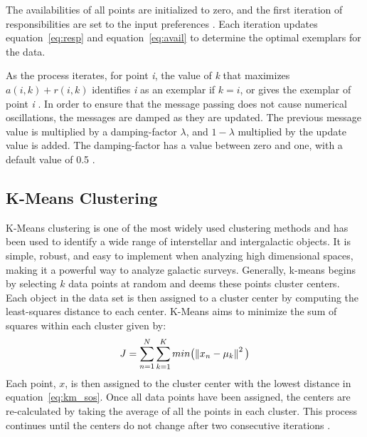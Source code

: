 The availabilities of all points are initialized to zero, and the first iteration of responsibilities are set to the input preferences \citet{frey07}. 
Each iteration updates equation~\ref{eq:resp} and equation~\ref{eq:avail} to determine the optimal exemplars for the data.

As the process iterates, for point \textit{i}, the value of \textit{k} that maximizes $a(i,k) + r(i,k)$ identifies \textit{i} as an exemplar if $k=i$, or gives the exemplar of point \textit{i} \citet{frey07}.
In order to ensure that the message passing does not cause numerical oscillations, the messages are damped as they are updated.
The previous message value is multiplied by a damping-factor $\lambda$, and $1 - \lambda$ multiplied by the update value is added.
The damping-factor has a value between zero and one, with a default value of 0.5 \citet{frey07}.

\subsection{K-Means Clustering}
K-Means clustering is one of the most widely used clustering methods and has been used to identify a wide range of interstellar and intergalactic objects. %
It is simple, robust, and easy to implement when analyzing high dimensional spaces, making it a powerful way to analyze galactic surveys. 
Generally, k-means begins by selecting $k$ data points at random and deems these points cluster centers.
Each object in the data set is then assigned to a cluster center by computing the least-squares distance to each center.
K-Means aims to minimize the sum of squares within each cluster given by:
\begin{equation}
\label{eq:km_sos}
J = \sum_{n=1}^N \sum_{k=1}^K min \big( \norm{x_n - \mu_k}^2 \big)
\end{equation}
Each point, $x$, is then assigned to the cluster center with the lowest distance in equation~\ref{eq:km_sos}\citet{tammour16}.
Once all data points have been assigned, the centers are re-calculated by taking the average of all the points in each cluster. 
This process continues until the centers do not change after two consecutive iterations \citet{sanchez-almeida13}. 

